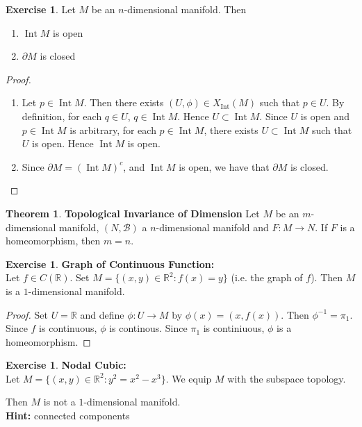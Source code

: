 \documentclass[12pt]{amsart}
\theoremstyle{definition}
\newtheorem{thm}[definition]{Theorem}
\newtheorem{ex}[definition]{Exercise}
\newcommand{\R}{\mathbb{R}}
\newcommand{\MB}{\mathcal{B}}
\newcommand{\p}{\partial}
\DeclareMathOperator{\Int}{Int}
\begin{document}
	\begin{ex}
		Let $M$ be an $n$-dimensional manifold. Then 
		\begin{enumerate}
			\item $\Int M$ is open
			\item $\p M$ is closed
		\end{enumerate}
	\end{ex}

	\begin{proof}\
		\begin{enumerate}
			\item Let $p \in \Int M$. Then there exists $(U, \phi) \in X_{\Int}(M)$ such that $p \in U$. By definition, for each $q \in U$, $q \in \Int M$. Hence $U \subset \Int M$. Since $U$ is open and $p \in \Int M$ is arbitrary, for each $p \in \Int M$, there exists $U \subset \Int M$ such that $U$ is open. Hence $\Int M$ is open. 
			\item Since $\p M = (\Int M)^c$, and $\Int M$ is open, we have that $\p M$ is closed.
		\end{enumerate}
	\end{proof}

	\begin{thm}\textbf{Topological Invariance of Dimension}
		Let $M$ be an $m$-dimensional manifold, $(N, \MB)$ a $n$-dimensional manifold and $F: M \rightarrow N$. If $F$ is a homeomorphism, then $m = n$.
	\end{thm}

	\begin{ex} \textbf{Graph of Continuous Function:} \\
		Let $f \in C(\R)$. Set $M = \{(x,y) \in \R^2: f(x) = y\}$ (i.e. the graph of $f$). Then $M$ is a $1$-dimensional manifold.  
	\end{ex}
	
	\begin{proof}
		Set $U = \R$ and define $\phi: U \rightarrow M$ by $\phi(x) = (x, f(x))$. Then $\phi^{-1} = \pi_1$. Since $f$ is continuous, $\phi$ is continous. Since $\pi_1$ is continiuous, $\phi$ is a homeomorphism.  
	\end{proof}
	
	\begin{ex} \textbf{Nodal Cubic:}\\
		Let $M = \{(x,y) \in \R^2: y^2 = x^2 - x^3\}$. We equip $M$ with the subspace topology.
		\begin{center}
		\end{center}
		Then $M$ is not a $1$-dimensional manifold.\\
		\textbf{Hint:} connected components
	\end{ex}
\end{document}
